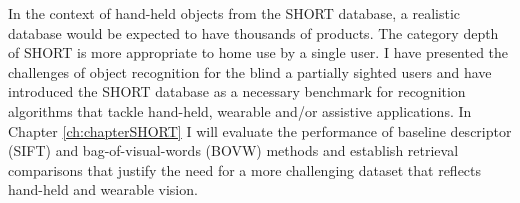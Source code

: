 In the context of hand-held objects from the SHORT database, a realistic database would be expected to have thousands of products. The category depth of SHORT is more appropriate to home use by a single user. I have presented the challenges of object recognition for the blind a partially sighted users and have introduced the SHORT database as a necessary benchmark for recognition algorithms that tackle hand-held, wearable and/or assistive applications. In Chapter \ref{ch:chapterSHORT} I will evaluate the performance of baseline descriptor (SIFT) and bag-of-visual-words (BOVW) methods and establish retrieval comparisons that justify the need for a more challenging dataset that reflects hand-held and wearable vision.




